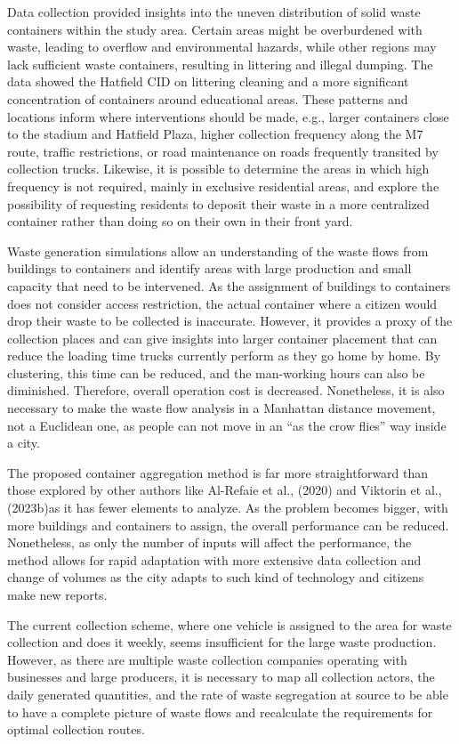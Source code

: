 \documentclass[authoryear,preprint,review,12pt]{elsarticle}
\begin{document}
    Data collection provided insights into the uneven distribution of solid waste containers within the study area. Certain areas might be overburdened with waste, leading to overflow and environmental hazards, while other regions may lack sufficient waste containers, resulting in littering and illegal dumping. The data showed the Hatfield CID on littering cleaning and a more significant concentration of containers around educational areas. These patterns and locations inform where interventions should be made, e.g., larger containers close to the stadium and Hatfield Plaza, higher collection frequency along the M7 route, traffic restrictions, or road maintenance on roads frequently transited by collection trucks. Likewise, it is possible to determine the areas in which high frequency is not required, mainly in exclusive residential areas, and explore the possibility of requesting residents to deposit their waste in a more centralized container rather than doing so on their own in their front yard.

    Waste generation simulations allow an understanding of the waste flows from buildings to containers and identify areas with large production and small capacity that need to be intervened. As the assignment of buildings to containers does not consider access restriction, the actual container where a citizen would drop their waste to be collected is inaccurate. However, it provides a proxy of the collection places and can give insights into larger container placement that can reduce the loading time trucks currently perform as they go home by home. By clustering, this time can be reduced, and the man-working hours can also be diminished. Therefore, overall operation cost is decreased. Nonetheless, it is also necessary to make the waste flow analysis in a Manhattan distance movement, not a Euclidean one, as people can not move in an “as the crow flies” way inside a city.

    The proposed container aggregation method is far more straightforward than those explored by other authors like Al-Refaie et al., (2020) and Viktorin et al., (2023b)as it has fewer elements to analyze. As the problem becomes bigger, with more buildings and containers to assign, the overall performance can be reduced. Nonetheless, as only the number of inputs will affect the performance, the method allows for rapid adaptation with more extensive data collection and change of volumes as the city adapts to such kind of technology and citizens make new reports.

    The current collection scheme, where one vehicle is assigned to the area for waste collection and does it weekly, seems insufficient for the large waste production. However, as there are multiple waste collection companies operating with businesses and large producers, it is necessary to map all collection actors, the daily generated quantities, and the rate of waste segregation at source to be able to have a complete picture of waste flows and recalculate the requirements for optimal collection routes.
\end{document}
